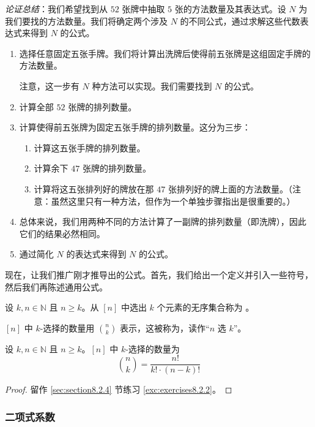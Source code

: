 \emph{论证总结}：我们希望找到从 $52$ 张牌中抽取 $5$ 张的方法数量及其表达式。设 $N$ 为我们要找的方法数量。我们将确定两个涉及 $N$ 的不同公式，通过求解这些代数表达式来得到 $N$ 的公式。

\begin{enumerate}[label=(\arabic*)]
    \item 选择任意固定五张手牌。我们将计算出洗牌后使得前五张牌是这组固定手牌的方法数量。

          注意，这一步有 $N$ 种方法可以实现。我们需要找到 $N$ 的公式。
    \item 计算全部 $52$ 张牌的排列数量。
    \item 计算使得前五张牌为固定五张手牌的排列数量。这分为三步：
          \begin{enumerate}[label=(\roman*)]
              \item 计算这五张手牌的排列数量。
              \item 计算余下 $47$ 张牌的排列数量。
              \item 计算将这五张排列好的牌放在那 $47$ 张排列好的牌上面的方法数量。（注意：虽然这里只有一种方法，但作为一个单独步骤指出是很重要的。）
          \end{enumerate}
    \item 总体来说，我们用两种不同的方法计算了一副牌的排列数量（即洗牌），因此它们的结果必然相同。
    \item 通过简化 $N$ 的表达式来得到 $N$ 的公式。
\end{enumerate}
现在，让我们推广刚才推导出的公式。首先，我们给出一个定义并引入一些符号，然后我们再陈述通用公式。

\begin{definition}
    设 $k, n \in \mathbb{N}$ 且 $n \ge k$。从 $[n]$ 中选出 $k$ 个元素的无序集合称为 。

    $[n]$ 中 $k$-选择的数量用 ${n \choose k}$ 表示，这被称为，读作``$n$ 选 $k$''。
\end{definition}

\begin{proposition}\label{prop:proposition8.2.16}
    设 $k, n \in \mathbb{N}$ 且 $n \ge k$。$[n]$ 中 $k$-选择的数量为
    \[{n \choose k} = \frac{n!}{k! \cdot (n-k)!}\]
\end{proposition}

\begin{proof}
    留作 \ref{sec:section8.2.4} 节练习 \ref{exc:exercises8.2.2}。
\end{proof}

\subsubsection*{二项式系数}

